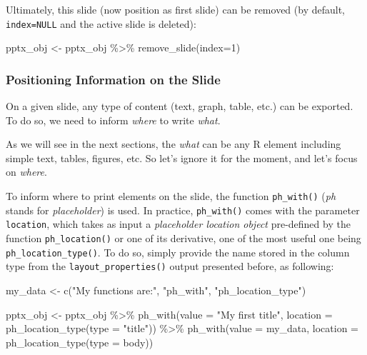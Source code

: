 \documentclass[
]{krantz}
\makeatletter
\newenvironment{Shaded}{\begin{snugshade}}{\end{snugshade}}
\newcommand{\AttributeTok}[1]{\textcolor[rgb]{0.61,0.61,0.61}{#1}}
\newcommand{\DecValTok}[1]{\textcolor[rgb]{0.06,0.06,0.06}{#1}}
\newcommand{\FunctionTok}[1]{\textcolor[rgb]{0,0,0}{#1}}
\newcommand{\NormalTok}[1]{#1}
\newcommand{\OtherTok}[1]{\textcolor[rgb]{0.37,0.37,0.37}{#1}}
\newcommand{\SpecialCharTok}[1]{\textcolor[rgb]{0,0,0}{#1}}
\newcommand{\StringTok}[1]{\textcolor[rgb]{0.5,0.5,0.5}{#1}}
\newenvironment{kframe}{%
\medskip{}
\setlength{\fboxsep}{.8em}
 \def\at@end@of@kframe{}%
 \ifinner\ifhmode%
  \def\at@end@of@kframe{\end{minipage}}%
  \begin{minipage}{\columnwidth}%
 \fi\fi%
 \def\FrameCommand##1{\hskip\@totalleftmargin \hskip-\fboxsep
 \colorbox{shadecolor}{##1}\hskip-\fboxsep
     \hskip-\linewidth \hskip-\@totalleftmargin \hskip\columnwidth}%
 \MakeFramed {\advance\hsize-\width
   \@totalleftmargin\z@ \linewidth\hsize
   \@setminipage}}%
 {\par\unskip\endMakeFramed%
 \at@end@of@kframe}
\renewenvironment{Shaded}{\begin{kframe}}{\end{kframe}}
\makeatother
\begin{document}
Ultimately, this slide (now position as first slide) can be removed (by default, \texttt{index=NULL} and the active slide is deleted):

\begin{Shaded}
\begin{Highlighting}[]
\NormalTok{pptx\_obj }\OtherTok{\textless{}{-}}\NormalTok{ pptx\_obj }\SpecialCharTok{\%\textgreater{}\%} 
  \FunctionTok{remove\_slide}\NormalTok{(}\AttributeTok{index=}\DecValTok{1}\NormalTok{)}
\end{Highlighting}
\end{Shaded}

\hypertarget{positioning-information-on-the-slide}{%
\subsubsection{Positioning Information on the Slide}\label{positioning-information-on-the-slide}}

On a given slide, any type of content (text, graph, table, etc.) can be exported. To do so, we need to inform \emph{where} to write \emph{what}.

As we will see in the next sections, the \emph{what} can be any R element including simple text, tables, figures, etc. So let's ignore it for the moment, and let's focus on \emph{where}.

To inform where to print elements on the slide, the function \texttt{ph\_with()} (\emph{ph} stands for \emph{placeholder}) is used. In practice, \texttt{ph\_with()} comes with the parameter \texttt{location}, which takes as input a \emph{placeholder location object} pre-defined by the function \texttt{ph\_location()} or one of its derivative, one of the most useful one being \texttt{ph\_location\_type()}. To do so, simply provide the name stored in the column type from the \texttt{layout\_properties()} output presented before, as following:

\begin{Shaded}
\begin{Highlighting}[]
\NormalTok{my\_data }\OtherTok{\textless{}{-}} \FunctionTok{c}\NormalTok{(}\StringTok{"My functions are:"}\NormalTok{, }\StringTok{"ph\_with"}\NormalTok{, }\StringTok{"ph\_location\_type"}\NormalTok{)}

\NormalTok{pptx\_obj }\OtherTok{\textless{}{-}}\NormalTok{ pptx\_obj }\SpecialCharTok{\%\textgreater{}\%}
  \FunctionTok{ph\_with}\NormalTok{(}\AttributeTok{value =} \StringTok{"My first title"}\NormalTok{, }\AttributeTok{location =} \FunctionTok{ph\_location\_type}\NormalTok{(}\AttributeTok{type =} \StringTok{"title"}\NormalTok{)) }\SpecialCharTok{\%\textgreater{}\%} 
  \FunctionTok{ph\_with}\NormalTok{(}\AttributeTok{value =}\NormalTok{ my\_data, }\AttributeTok{location =} \FunctionTok{ph\_location\_type}\NormalTok{(}\AttributeTok{type =} \StringTok{\textquotesingle{}body\textquotesingle{}}\NormalTok{))}
\end{Highlighting}
\end{Shaded}
\end{document}
